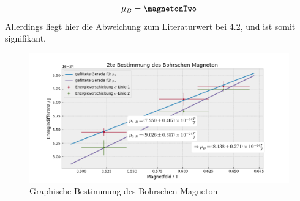         \begin{align}
          \mu_B = \magnetonTwo
        \end{align}
        Allerdings liegt hier die Abweichung zum Literaturwert bei \SI{4.2}{\sigma}, und ist somit signifikant.
        \begin{figure}[H]
          \centering
          \hspace*{-1.5cm}\includegraphics[width=1.2\textwidth]{Auswertung/mu_B2}
          \caption{Graphische Bestimmung des Bohrschen Magneton}
          \label{plot::4}
        \end{figure}
